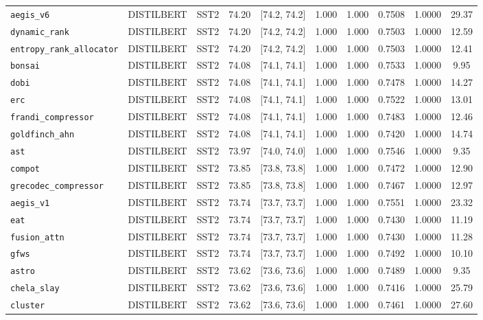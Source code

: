 \begin{table}[t]
\begin{tabular}{l l l c c c c c c c}
\texttt{aegis\_v6} & DISTILBERT & SST2 & 74.20 & [74.2, 74.2] & 1.000 & 1.000 & 0.7508 & 1.0000 & 29.37 \\
\texttt{dynamic\_rank} & DISTILBERT & SST2 & 74.20 & [74.2, 74.2] & 1.000 & 1.000 & 0.7503 & 1.0000 & 12.59 \\
\texttt{entropy\_rank\_allocator} & DISTILBERT & SST2 & 74.20 & [74.2, 74.2] & 1.000 & 1.000 & 0.7503 & 1.0000 & 12.41 \\
\texttt{bonsai} & DISTILBERT & SST2 & 74.08 & [74.1, 74.1] & 1.000 & 1.000 & 0.7533 & 1.0000 & 9.95 \\
\texttt{dobi} & DISTILBERT & SST2 & 74.08 & [74.1, 74.1] & 1.000 & 1.000 & 0.7478 & 1.0000 & 14.27 \\
\texttt{erc} & DISTILBERT & SST2 & 74.08 & [74.1, 74.1] & 1.000 & 1.000 & 0.7522 & 1.0000 & 13.01 \\
\texttt{frandi\_compressor} & DISTILBERT & SST2 & 74.08 & [74.1, 74.1] & 1.000 & 1.000 & 0.7483 & 1.0000 & 12.46 \\
\texttt{goldfinch\_ahn} & DISTILBERT & SST2 & 74.08 & [74.1, 74.1] & 1.000 & 1.000 & 0.7420 & 1.0000 & 14.74 \\
\texttt{ast} & DISTILBERT & SST2 & 73.97 & [74.0, 74.0] & 1.000 & 1.000 & 0.7546 & 1.0000 & 9.35 \\
\texttt{compot} & DISTILBERT & SST2 & 73.85 & [73.8, 73.8] & 1.000 & 1.000 & 0.7472 & 1.0000 & 12.90 \\
\texttt{grecodec\_compressor} & DISTILBERT & SST2 & 73.85 & [73.8, 73.8] & 1.000 & 1.000 & 0.7467 & 1.0000 & 12.97 \\
\texttt{aegis\_v1} & DISTILBERT & SST2 & 73.74 & [73.7, 73.7] & 1.000 & 1.000 & 0.7551 & 1.0000 & 23.32 \\
\texttt{eat} & DISTILBERT & SST2 & 73.74 & [73.7, 73.7] & 1.000 & 1.000 & 0.7430 & 1.0000 & 11.19 \\
\texttt{fusion\_attn} & DISTILBERT & SST2 & 73.74 & [73.7, 73.7] & 1.000 & 1.000 & 0.7430 & 1.0000 & 11.28 \\
\texttt{gfws} & DISTILBERT & SST2 & 73.74 & [73.7, 73.7] & 1.000 & 1.000 & 0.7492 & 1.0000 & 10.10 \\
\texttt{astro} & DISTILBERT & SST2 & 73.62 & [73.6, 73.6] & 1.000 & 1.000 & 0.7489 & 1.0000 & 9.35 \\
\texttt{chela\_slay} & DISTILBERT & SST2 & 73.62 & [73.6, 73.6] & 1.000 & 1.000 & 0.7416 & 1.0000 & 25.79 \\
\texttt{cluster} & DISTILBERT & SST2 & 73.62 & [73.6, 73.6] & 1.000 & 1.000 & 0.7461 & 1.0000 & 27.60 \\

\end{tabular}
\end{table}
